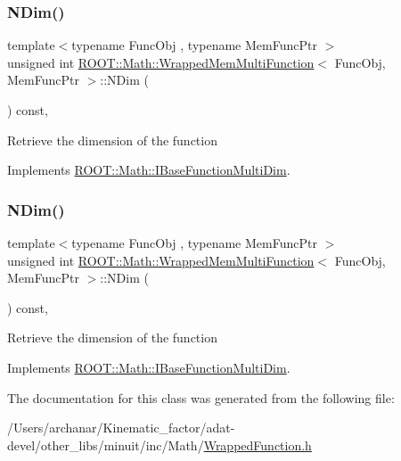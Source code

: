 \subsubsection{\texorpdfstring{NDim()}{NDim()}\hspace{0.1cm}{\footnotesize\ttfamily [2/3]}}
{\footnotesize\ttfamily template$<$typename Func\+Obj , typename Mem\+Func\+Ptr $>$ \\
unsigned int \mbox{\hyperlink{classROOT_1_1Math_1_1WrappedMemMultiFunction}{R\+O\+O\+T\+::\+Math\+::\+Wrapped\+Mem\+Multi\+Function}}$<$ Func\+Obj, Mem\+Func\+Ptr $>$\+::N\+Dim (\begin{DoxyParamCaption}{ }\end{DoxyParamCaption}) const\hspace{0.3cm}{\ttfamily [inline]}, {\ttfamily [virtual]}}

Retrieve the dimension of the function 

Implements \mbox{\hyperlink{classROOT_1_1Math_1_1IBaseFunctionMultiDim_a16f37dc7a6d00c75ddeda0697741315d}{R\+O\+O\+T\+::\+Math\+::\+I\+Base\+Function\+Multi\+Dim}}.

\mbox{\label{classROOT_1_1Math_1_1WrappedMemMultiFunction_ae9aaf3de1f2e1e6e1c1310fccdb06009}} 
\subsubsection{\texorpdfstring{NDim()}{NDim()}\hspace{0.1cm}{\footnotesize\ttfamily [3/3]}}
{\footnotesize\ttfamily template$<$typename Func\+Obj , typename Mem\+Func\+Ptr $>$ \\
unsigned int \mbox{\hyperlink{classROOT_1_1Math_1_1WrappedMemMultiFunction}{R\+O\+O\+T\+::\+Math\+::\+Wrapped\+Mem\+Multi\+Function}}$<$ Func\+Obj, Mem\+Func\+Ptr $>$\+::N\+Dim (\begin{DoxyParamCaption}{ }\end{DoxyParamCaption}) const\hspace{0.3cm}{\ttfamily [inline]}, {\ttfamily [virtual]}}

Retrieve the dimension of the function 

Implements \mbox{\hyperlink{classROOT_1_1Math_1_1IBaseFunctionMultiDim_a16f37dc7a6d00c75ddeda0697741315d}{R\+O\+O\+T\+::\+Math\+::\+I\+Base\+Function\+Multi\+Dim}}.



The documentation for this class was generated from the following file\+:\begin{DoxyCompactItemize}
\item 
/\+Users/archanar/\+Kinematic\+\_\+factor/adat-\/devel/other\+\_\+libs/minuit/inc/\+Math/\mbox{\hyperlink{adat-devel_2other__libs_2minuit_2inc_2Math_2WrappedFunction_8h}{Wrapped\+Function.\+h}}\end{DoxyCompactItemize}
